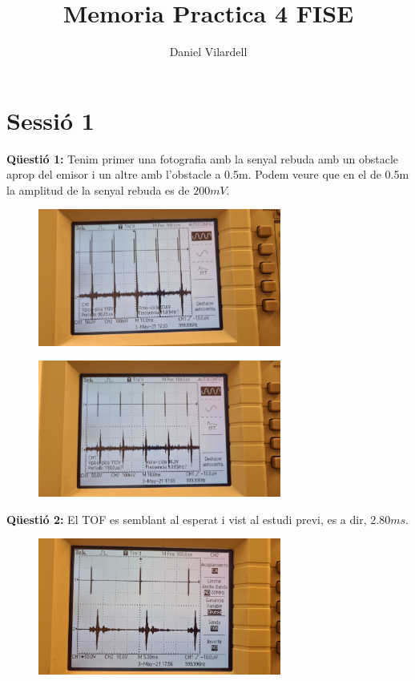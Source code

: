 \documentclass[12pt, a4papre]{article}
\author{Daniel Vilardell}
\title{Memoria Practica 4 FISE}
\date{}
\begin{document}
	\maketitle
	
	\section{Sessió 1}
	
	\textbf{Qüestió 1:} Tenim primer una fotografia amb la senyal rebuda amb un obstacle aprop del emisor i un altre amb l'obstacle a 0.5m. Podem veure que en el de 0.5m la amplitud de la senyal rebuda es de $200mV$.

	\begin{figure}[H]
		\begin{center}
		\includegraphics[width=80mm]{p4_1_1.jpeg}
		\end{center}
	\end{figure}
	
	\begin{figure}[H]
		\begin{center}
		\includegraphics[width=80mm]{p4_1_2.jpeg}
		\end{center}
	\end{figure}
	
	\textbf{Qüestió 2:} El TOF es semblant al esperat i vist al estudi previ, es a dir, $2.80ms$.
	
	\begin{figure}[H]
		\begin{center}
		\includegraphics[width=80mm]{p4_2.jpeg}
		\end{center}
	\end{figure}
	
\end{document}
